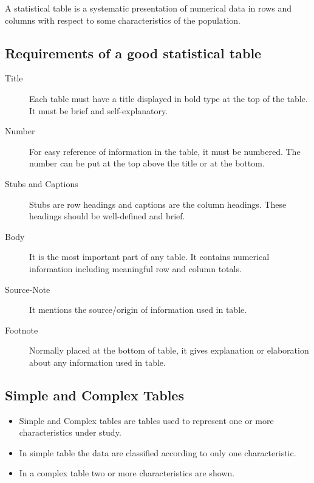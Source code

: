 \documentclass[
10pt, %
a4paper, %
]{report}
\begin{document}
A statistical table is a systematic presentation of numerical data in rows and columns with respect to some characteristics of the population.

\subsection{Requirements of a good statistical table}
\begin{description}
\item[Title] Each table must have a title
displayed in bold type at the top of the table. It must
be brief and self-explanatory.
\item[Number] For easy reference of information in
the table, it must be numbered. The number can be
put at the top above the title or at the bottom.
\item [Stubs and Captions] Stubs are row headings and
captions are the column headings. These headings
should be well-defined and brief.
\item[Body] It is the most important part of any
table. It contains numerical information including
meaningful row and column totals.
\item[Source-Note] It mentions the source/origin of
information used in table.
\item[Footnote] Normally placed at the bottom of table, it gives explanation or elaboration about any information used in table.
\end{description}

\subsection{Simple and Complex Tables}
\begin{itemize}
\item Simple and Complex tables are tables used to represent one or more characteristics under study.
\item In simple table the data are classified according to only one characteristic.
\item In a complex table two or more characteristics are shown.
\end{itemize}
\end{document}
